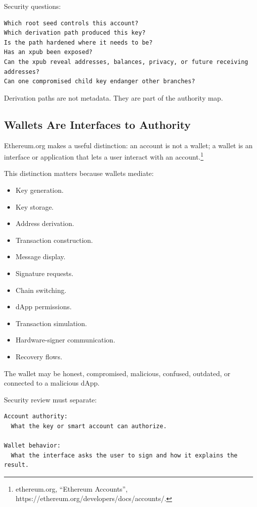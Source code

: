 Security questions:

\begin{lstlisting}
Which root seed controls this account?
Which derivation path produced this key?
Is the path hardened where it needs to be?
Has an xpub been exposed?
Can the xpub reveal addresses, balances, privacy, or future receiving addresses?
Can one compromised child key endanger other branches?
\end{lstlisting}

Derivation paths are not metadata. They are part of the authority map.

\subsection{Wallets Are Interfaces to Authority}

Ethereum.org makes a useful distinction: an account is not a wallet; a
wallet is an interface or application that lets a user interact with an
account.\footnote{ethereum.org, ``Ethereum Accounts'',
  https://ethereum.org/developers/docs/accounts/.}

This distinction matters because wallets mediate:

\begin{itemize}
\tightlist
\item
  Key generation.
\item
  Key storage.
\item
  Address derivation.
\item
  Transaction construction.
\item
  Message display.
\item
  Signature requests.
\item
  Chain switching.
\item
  dApp permissions.
\item
  Transaction simulation.
\item
  Hardware-signer communication.
\item
  Recovery flows.
\end{itemize}

The wallet may be honest, compromised, malicious, confused, outdated, or
connected to a malicious dApp.

Security review must separate:

\begin{lstlisting}
Account authority:
  What the key or smart account can authorize.

Wallet behavior:
  What the interface asks the user to sign and how it explains the result.
\end{lstlisting}

